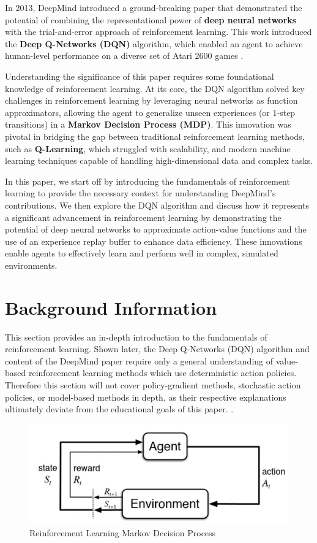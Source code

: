 \documentclass{article}
\begin{document}
In 2013, DeepMind introduced a ground-breaking paper that demonstrated the potential of combining the representational power of \textbf{deep neural networks} with the trial-and-error approach of reinforcement learning. This work introduced the \textbf{Deep Q-Networks (DQN)} algorithm, which enabled an agent to achieve human-level performance on a diverse set of Atari 2600 games \cite{dqn}.

Understanding the significance of this paper requires some foundational knowledge of reinforcement learning. At its core, the DQN algorithm solved key challenges in reinforcement learning by leveraging neural networks as function approximators, allowing the agent to generalize unseen experiences (or 1-step transitions) in a \textbf{Markov Decision Process (MDP)}. This innovation was pivotal in bridging the gap between traditional reinforcement learning methods, such as \textbf{Q-Learning}, which struggled with scalability, and modern machine learning techniques capable of handling high-dimensional data and complex tasks.

In this paper, we start off by introducing the fundamentals of reinforcement learning to provide the necessary context for understanding DeepMind's contributions. We then explore the DQN algorithm and discuss how it represents a significant advancement in reinforcement learning by demonstrating the potential of deep neural networks to approximate action-value functions and the use of an experience replay buffer to enhance data efficiency. These innovations enable agents to effectively learn and perform well in complex, simulated environments.

\section{Background Information}

This section provides an in-depth introduction to the fundamentals of reinforcement learning. Shown later, the Deep Q-Networks (DQN) algorithm and content of the DeepMind paper require only a general understanding of value-based reinforcement learning methods which use deterministic action policies. Therefore this section will not cover policy-gradient methods, stochastic action policies, or model-based methods in depth, as their respective explanations ultimately deviate from the educational goals of this paper. \cite{MutualInformationRLByTheBook}.

\begin{figure}[H]
    \centering
    \includegraphics[width=0.75\linewidth]{image.png}
    \caption{Reinforcement Learning Markov Decision Process}
    \label{fig:rlloop}
\end{figure}
\end{document}
